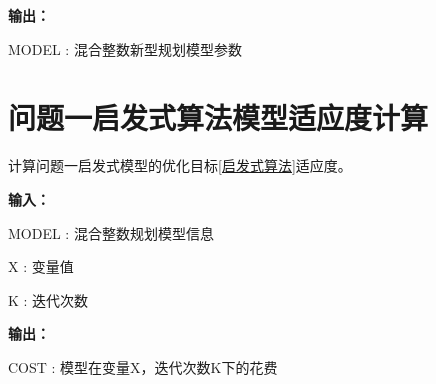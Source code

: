 \documentclass[bwprint]{gmcmthesis}
\begin{document}
\textbf{输出：} 

MODEL : 混合整数新型规划模型参数







\newpage
\section{问题一启发式算法模型适应度计算}

计算问题一启发式模型的优化目标\ref{启发式算法}适应度。

\textbf{输入：} 

MODEL : 混合整数规划模型信息

X : 变量值

K : 迭代次数

\textbf{输出：} 

COST : 模型在变量X，迭代次数K下的花费


\end{document}
